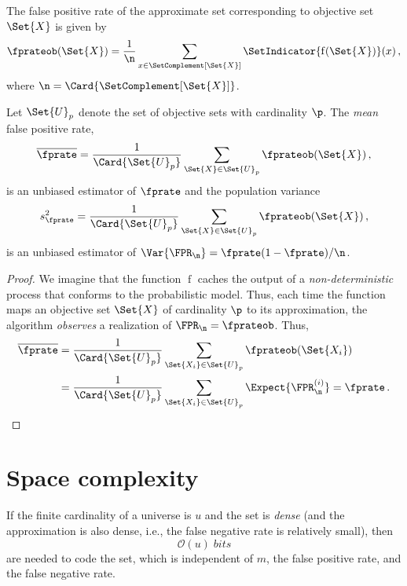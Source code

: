 \documentclass[ ../main.tex]{subfiles}
\begin{document}
The false positive rate of the approximate set corresponding 
to objective set $\Set{X}$ is given by
\begin{equation}
    \fprateob(\Set{X}) = \frac{1}{\n} \sum_{x \in \SetComplement[\Set{X}]} \SetIndicator{\operatorname{f}(\Set{X})}(x)\,,
\end{equation}
where $\n = \Card{\SetComplement[\Set{X}]}$.

Let $\Set{U}_p$ denote the set of objective sets with cardinality $\p$. The 
\emph{mean} false positive rate,
\begin{equation}
    \overline{\fprate} = \frac{1}{\Card{\Set{U}_p}}
        \sum_{\Set{X} \in \Set{U}_p} \fprateob(\Set{X})\,,
\end{equation}
is an unbiased estimator of $\fprate$ and the population variance
\begin{equation}
    s^2_\fprate = \frac{1}{\Card{\Set{U}_p}}
        \sum_{\Set{X} \in \Set{U}_p} \fprateob(\Set{X})\,,
\end{equation}
is an unbiased estimator of $\Var{\FPR_\n} = \fprate(1-\fprate)/\n$.
\begin{proof}
We imagine that the function $\operatorname{f}$ caches the output of a 
\emph{non-deterministic} process that conforms to the probabilistic model. Thus, 
each time the function maps an objective set $\Set{X}$ of cardinality $\p$ to 
its approximation, the algorithm \emph{observes} a realization of 
$\FPR_\n = \fprateob$. Thus,
\begin{align}
    \overline{\fprate}
        &= \frac{1}{\Card{\Set{U}_p}} 
            \sum_{\Set{X_i} \in \Set{U}_p} \fprateob(\Set{X_i})\\
        &= \frac{1}{\Card{\Set{U}_p}} 
            \sum_{\Set{X_i} \in \Set{U}_p} \Expect{\FPR_\n^{(i)}} = \fprate\,.
\end{align}
\end{proof}

\section{Space complexity}
\label{sec:space_comp}
If the finite cardinality of a universe is $u$ and the set is \emph{dense} (and 
the approximation is also dense, i.e., the false negative rate is relatively 
small), then
\begin{equation}
    \mathcal{O}(u) \; \si{bits}
\end{equation}
are needed to code the set, which is independent of $m$, the false positive 
rate, and the false negative rate.
\end{document}
